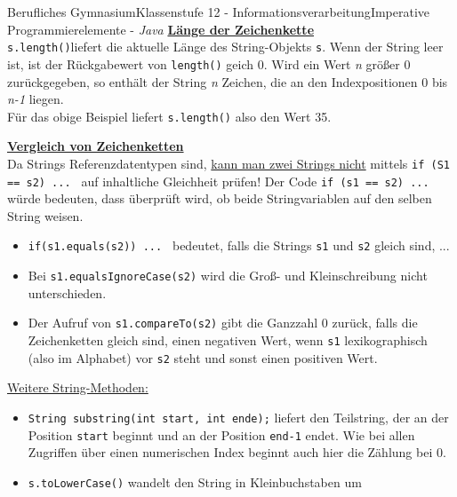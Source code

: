 \documentclass[oneside,openany,headings=optiontotoc,11pt,numbers=noenddot]{article}
\begin{document}
\begin{worksheet}{Berufliches Gymnasium}{Klassenstufe 12 - Informationsverarbeitung}{Imperative Programmierelemente - \textit{Java}}
		\textbf{\underline{Länge der Zeichenkette}}\\ \lstinline[style=JavaInputStyle]|s.length()|liefert die aktuelle Länge des String-Objekts \lstinline[style=JavaInputStyle]|s|. Wenn der String leer ist, ist der Rückgabewert von \lstinline[style=JavaInputStyle]|length()| geich 0. Wird ein Wert \textit{n} größer 0 zurückgegeben, so enthält der String \textit{n} Zeichen, die an den Indexpositionen 0 bis \textit{n-1} liegen.\\
		Für das obige Beispiel liefert \lstinline[style=JavaInputStyle]|s.length()| also den Wert 35.\\
		\par\noindent
		\textbf{\underline{Vergleich von Zeichenketten}}\\
		Da Strings Referenzdatentypen sind, \underline{kann man zwei Strings nicht} mittels \lstinline[style=JavaInputStyle]|if (S1 == s2) ... | auf inhaltliche Gleichheit prüfen! Der Code \lstinline[style=JavaInputStyle]|if (s1 == s2) ... | würde bedeuten, dass überprüft wird, ob beide Stringvariablen auf den selben String weisen.
		\begin{itemize}
			\item \lstinline[style=JavaInputStyle]|if(s1.equals(s2)) ... | bedeutet, falls die Strings \lstinline[style=JavaInputStyle]|s1| und \lstinline[style=JavaInputStyle]|s2| gleich sind, ...
			\item Bei \lstinline[style=JavaInputStyle]|s1.equalsIgnoreCase(s2)| wird die Groß- und Kleinschreibung nicht unterschieden.
			\item Der Aufruf von \lstinline[style=JavaInputStyle]|s1.compareTo(s2)| gibt die Ganzzahl 0 zurück, falls die Zeichenketten gleich sind, einen negativen Wert, wenn \lstinline[style=JavaInputStyle]|s1| lexikographisch (also im Alphabet) vor \lstinline[style=JavaInputStyle]|s2| steht und sonst einen positiven Wert.
		\end{itemize}
		\par\noindent
		\underline{Weitere String-Methoden:}
		\begin{itemize}
			\item \lstinline[style=JavaInputStyle]|String substring(int start, int ende);| liefert den Teilstring, der an der Position \lstinline[style=JavaInputStyle]|start| beginnt und an der Position \lstinline[style=JavaInputStyle]|end-1| endet. Wie bei allen Zugriffen über einen numerischen Index beginnt auch hier die Zählung bei 0.
			\item \lstinline[style=JavaInputStyle]|s.toLowerCase()| wandelt den String in Kleinbuchstaben um

\end{itemize}
\end{worksheet}
\end{document}
